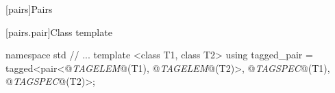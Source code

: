 \setcounter{section}{2}

[pairs]{Pairs}

\setcounter{subsection}{1}

[pairs.pair]{Class template }


{\color{newclr}
\begin{codeblock}
namespace std {
  // ...
  template <class T1, class T2>
  using tagged_pair = tagged<pair<@\textit{TAGELEM}@(T1), @\textit{TAGELEM}@(T2)>,
                             @\textit{TAGSPEC}@(T1), @\textit{TAGSPEC}@(T2)>;
}
\end{codeblock}
}


\setcounter{subsection}{5}

